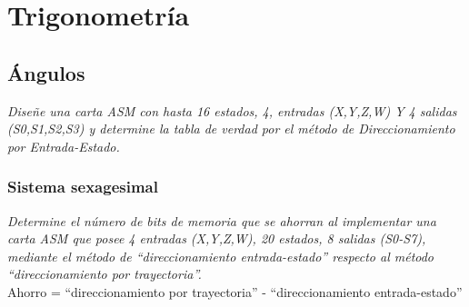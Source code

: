 \documentclass[12pt]{book}
\begin{document}

\graphicspath{ {latex/assets/} }
\newcommand{\materia}{Trigonometría}


\chapter{\materia}

\section{Ángulos}

\textit{Diseñe una carta ASM con hasta 16 estados, 4, entradas (X,Y,Z,W) Y
4 salidas (S0,S1,S2,S3) y determine la tabla de verdad por el método
de Direccionamiento por Entrada-Estado.}\\


\subsection{Sistema sexagesimal}

\begin{activity}{0.8}
  \lipsum[1]
\end{activity}

\textit{Determine el número de bits de memoria que se ahorran al
implementar una carta ASM que posee 4 entradas (X,Y,Z,W), 20
estados, 8 salidas (S0-S7), mediante el método de ``direccionamiento
entrada-estado'' respecto al método ``direccionamiento por trayectoria''.}\\

Ahorro = ``direccionamiento por trayectoria'' - ``direccionamiento
entrada-estado''\\ 

\end{document}
